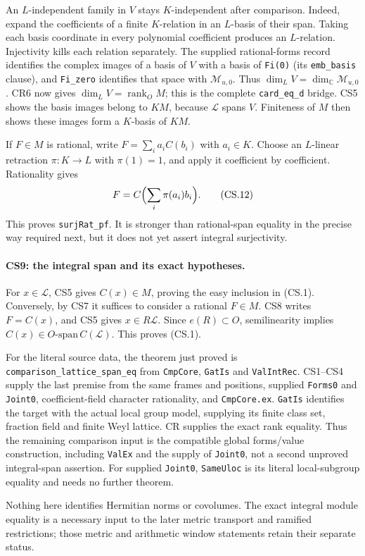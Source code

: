 An $L$-independent family in $V$ stays $K$-independent after comparison.
Indeed, expand the coefficients of a finite $K$-relation in an
$L$-basis of their span. Taking each basis coordinate in every
polynomial coefficient produces an $L$-relation. Injectivity kills
each relation separately. The supplied rational-forms record identifies
the complex images of a basis of $V$ with a basis of \texttt{Fi(0)}
(its \texttt{emb\_basis} clause), and \texttt{Fi\_zero} identifies
that space with $\mathcal M_{u,0}$. Thus $\dim_LV=\dim_{\mathbb C}\mathcal M_{u,0}$.
CR6 now gives $\dim_LV=\operatorname{rank}_O M$; this is the complete
\texttt{card\_eq\_d} bridge. CS5 shows the basis images
belong to $KM$, because $\mathcal L$ spans $V$. Finiteness of $M$
then shows these images form a $K$-basis of $KM$.

If $F\in M$ is rational, write $F=\sum_i a_iC(b_i)$ with $a_i\in K$.
Choose an $L$-linear retraction $\pi:K\to L$ with $\pi(1)=1$,
and apply it coefficient by coefficient. Rationality gives
\[
 F=C\Bigl(\sum_i\pi(a_i)b_i\Bigr).                     \tag{CS.12}
\]
This proves \texttt{surjRat\_pf}. It is stronger than rational-span
equality in the precise way required next, but it does not yet assert
integral surjectivity.

\paragraph{CS9: the integral span and its exact hypotheses.}
For $x\in\mathcal L$, CS5 gives $C(x)\in M$, proving the easy
inclusion in (CS.1). Conversely, by CS7 it suffices to consider a
rational $F\in M$. CS8 writes $F=C(x)$, and CS5 gives
$x\in R\mathcal L$. Since $e(R)\subset O$, semilinearity implies
$C(x)\in O\text{-span}\,C(\mathcal L)$. This proves (CS.1).

For the literal source data, the theorem just proved is
\texttt{comparison\_lattice\_span\_eq} from
\texttt{CmpCore}, \texttt{GatIs} and \texttt{ValIntRec}.
CS1--CS4 supply the last premise from the same frames and positions,
supplied \texttt{Forms0} and \texttt{Joint0}, coefficient-field character
rationality, and \texttt{CmpCore.ex}.
\texttt{GatIs} identifies the target with the actual local group
model, supplying its finite class set, fraction field and finite
Weyl lattice. CR supplies the exact rank equality. Thus the remaining
comparison input is the compatible global forms/value construction,
including \texttt{ValEx} and the supply of \texttt{Joint0}, not a second
unproved integral-span assertion. For supplied \texttt{Joint0},
\texttt{SameUloc} is its literal local-subgroup equality and needs
no further theorem.

Nothing here identifies Hermitian norms or covolumes. The exact
integral module equality is a necessary input to the later metric
transport and ramified restrictions; those metric and arithmetic
window statements retain their separate status.
